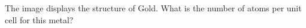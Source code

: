 \documentclass[main.tex]{subfiles}
\begin{document}
\begin{multicols*}{2}
\begin{question}[ID=\the\value{numA}]
The image displays the structure of Gold. What is the number of atoms per unit cell for this metal?
\begin{center}
\scalebox{0.2}{
\begin{tikzpicture}
%
%
%

\end{tikzpicture}}
\end{center}
\end{question}
\end{multicols*}
\end{document}
